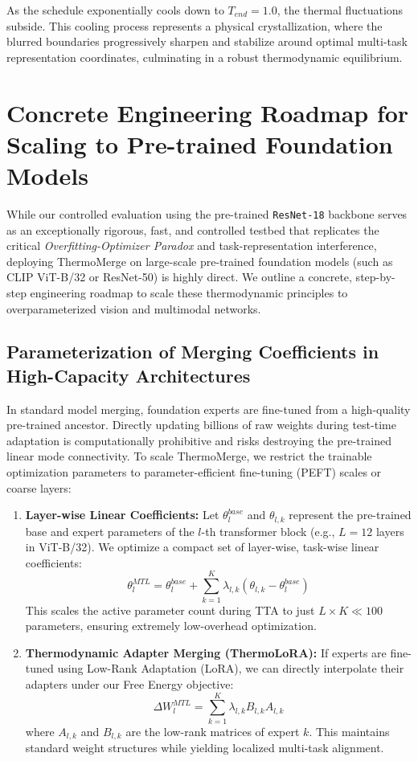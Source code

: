 \documentclass{article}
\theoremstyle{plain}
\theoremstyle{definition}
\theoremstyle{remark}
\begin{document}
As the schedule exponentially cools down to $T_{end}=1.0$, the thermal fluctuations subside. This cooling process represents a physical crystallization, where the blurred boundaries progressively sharpen and stabilize around optimal multi-task representation coordinates, culminating in a robust thermodynamic equilibrium.

\section{Concrete Engineering Roadmap for Scaling to Pre-trained Foundation Models}
\label{sec:scaling_roadmap}

While our controlled evaluation using the pre-trained \texttt{ResNet-18} backbone serves as an exceptionally rigorous, fast, and controlled testbed that replicates the critical \emph{Overfitting-Optimizer Paradox} and task-representation interference, deploying ThermoMerge on large-scale pre-trained foundation models (such as CLIP ViT-B/32 or ResNet-50) is highly direct. We outline a concrete, step-by-step engineering roadmap to scale these thermodynamic principles to overparameterized vision and multimodal networks.

\subsection{Parameterization of Merging Coefficients in High-Capacity Architectures}
In standard model merging, foundation experts are fine-tuned from a high-quality pre-trained ancestor. Directly updating billions of raw weights during test-time adaptation is computationally prohibitive and risks destroying the pre-trained linear mode connectivity. To scale ThermoMerge, we restrict the trainable optimization parameters to parameter-efficient fine-tuning (PEFT) scales or coarse layers:
\begin{enumerate}
    \item \textbf{Layer-wise Linear Coefficients:} Let $\theta_l^{base}$ and $\theta_{l,k}$ represent the pre-trained base and expert parameters of the $l$-th transformer block (e.g., $L=12$ layers in ViT-B/32). We optimize a compact set of layer-wise, task-wise linear coefficients:
    \begin{equation}
    \theta_l^{MTL} = \theta_l^{base} + \sum_{k=1}^K \lambda_{l,k} (\theta_{l,k} - \theta_l^{base})
    \end{equation}
    This scales the active parameter count during TTA to just $L \times K \ll 100$ parameters, ensuring extremely low-overhead optimization.
    \item \textbf{Thermodynamic Adapter Merging (ThermoLoRA):} If experts are fine-tuned using Low-Rank Adaptation (LoRA), we can directly interpolate their adapters under our Free Energy objective:
    \begin{equation}
    \Delta W_l^{MTL} = \sum_{k=1}^K \lambda_{l,k} B_{l,k} A_{l,k}
    \end{equation}
    where $A_{l,k}$ and $B_{l,k}$ are the low-rank matrices of expert $k$. This maintains standard weight structures while yielding localized multi-task alignment.
\end{enumerate}
\end{document}
